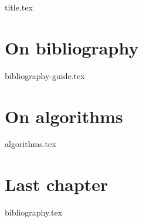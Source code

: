 \documentclass[a4paper,11pt,oneside]{book}
\begin{document}
 
\frontmatter
{title.tex}
 
\clearpage
\thispagestyle{empty}
 
\tableofcontents
 
\mainmatter
\chapter{On bibliography}
{bibliography-guide.tex}
 
\chapter{On algorithms}
{algorithms.tex}
 
\chapter{Last chapter}
 
\backmatter
 
{bibliography.tex}
 
\end{document}
